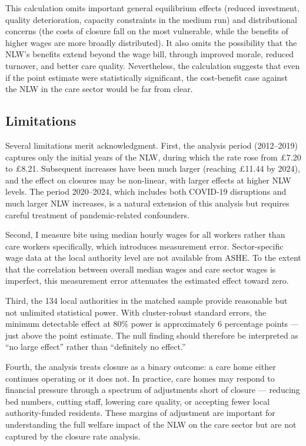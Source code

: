\documentclass[12pt]{article}
\begin{document}
This calculation omits important general equilibrium effects (reduced investment, quality deterioration, capacity constraints in the medium run) and distributional concerns (the costs of closure fall on the most vulnerable, while the benefits of higher wages are more broadly distributed). It also omits the possibility that the NLW's benefits extend beyond the wage bill, through improved morale, reduced turnover, and better care quality. Nevertheless, the calculation suggests that even if the point estimate were statistically significant, the cost-benefit case against the NLW in the care sector would be far from clear.

\subsection{Limitations}

Several limitations merit acknowledgment. First, the analysis period (2012--2019) captures only the initial years of the NLW, during which the rate rose from \pounds7.20 to \pounds8.21. Subsequent increases have been much larger (reaching \pounds11.44 by 2024), and the effect on closures may be non-linear, with larger effects at higher NLW levels. The period 2020--2024, which includes both COVID-19 disruptions and much larger NLW increases, is a natural extension of this analysis but requires careful treatment of pandemic-related confounders.

Second, I measure bite using median hourly wages for all workers rather than care workers specifically, which introduces measurement error. Sector-specific wage data at the local authority level are not available from ASHE. To the extent that the correlation between overall median wages and care sector wages is imperfect, this measurement error attenuates the estimated effect toward zero.

Third, the 134 local authorities in the matched sample provide reasonable but not unlimited statistical power. With cluster-robust standard errors, the minimum detectable effect at 80\% power is approximately 6 percentage points --- just above the point estimate. The null finding should therefore be interpreted as ``no large effect'' rather than ``definitely no effect.''

Fourth, the analysis treats closure as a binary outcome: a care home either continues operating or it does not. In practice, care homes may respond to financial pressure through a spectrum of adjustments short of closure --- reducing bed numbers, cutting staff, lowering care quality, or accepting fewer local authority-funded residents. These margins of adjustment are important for understanding the full welfare impact of the NLW on the care sector but are not captured by the closure rate analysis.
\end{document}
